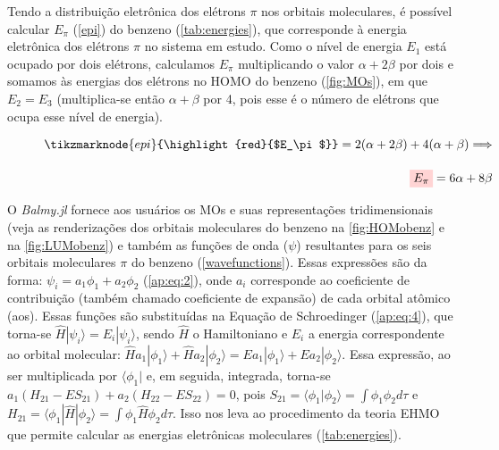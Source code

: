 Tendo a distribuição eletrônica dos elétrons $\pi$ nos orbitais moleculares, é possível calcular $E_\pi$ (\autoref{epi}) do benzeno (\autoref{tab:energies}), que corresponde à energia eletrônica dos elétrons $\pi$ no sistema em estudo. Como o nível de energia $E_1$ está ocupado por dois elétrons, calculamos $E_\pi$ multiplicando o valor $\alpha + 2 \beta$ por dois e somamos às energias dos elétrons no \gls{HOMO} do benzeno (\autoref{fig:MOs}), em que $E_2 = E_3$ (multiplica-se então $\alpha + \beta$ por 4, pois esse é o número de elétrons que ocupa esse nível de energia).


\begin{figure}[htb]
\vspace{2.3\baselineskip}
\begin{equation}
\begin{split}
    \label{epi}
    \tikzmarknode{epi}{\highlight{red}{$E_\pi$}} = 2(\alpha + 2\beta) + 4(\alpha + \beta) \Longrightarrow \\[0.35cm] \highlight{red}{$E_\pi$} = 6\alpha + 8\beta
\end{split}
\end{equation}
\end{figure}

\newpage

O \textit{Balmy.jl} fornece aos usuários os \gls{MOs} e suas representações tridimensionais (veja as renderizações dos orbitais moleculares do benzeno na \autoref{fig:HOMobenz} e na \autoref{fig:LUMobenz}) e também as funções de onda ($\psi$) resultantes para os seis orbitais moleculares $\pi$ do benzeno (\autoref{wavefunctions}). Essas expressões são da forma: $\psi_i = a_1 \phi_1 + a_2 \phi_2$ (\autoref{ap:eq:2}), onde $a_i$ corresponde ao coeficiente de contribuição (também chamado coeficiente de expansão) de cada orbital atômico (\gls{aos}). Essas funções são substituídas na Equação de Schroedinger (\autoref{ap:eq:4}), que torna-se $\hat{H} |\psi_i \rangle = E_i |\psi_i \rangle$, sendo $\hat{H}$ o Hamiltoniano e $E_i$ a energia correspondente ao orbital molecular: $\hat{H}a_1|\phi_1\rangle + \hat{H}a_2|\phi_2\rangle = Ea_1|\phi_1\rangle + Ea_2|\phi_2\rangle$. Essa expressão, ao ser multiplicada por $\langle \phi_1 |$ e, em seguida, integrada, torna-se $a_1(H_{21} - ES_{21}) + a_2(H_{22} - ES_{22}) = 0$, pois $S_{21} = \langle \phi_1 | \phi_2 \rangle = \displaystyle \int \phi_1 \phi_2 d\tau$ e $H_{21} = \langle \phi_1 | \hat{H} | \phi_2 \rangle = \displaystyle \int \phi_1 \hat{H} \phi_2 d\tau$. Isso nos leva ao procedimento da teoria \gls{EHMO} que permite calcular as energias eletrônicas moleculares (\autoref{tab:energies}).

